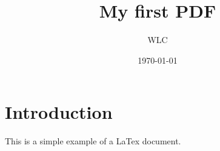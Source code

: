 \documentclass{article}
\begin{document}
\title{My first PDF}
\author{WLC}
\date{\today}
\maketitle

\section{Introduction}
This is a simple example of a LaTex document.
\end{document}
